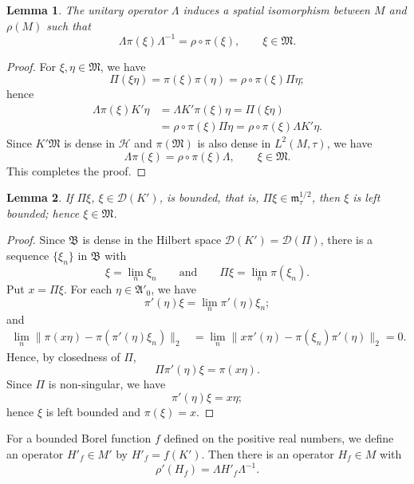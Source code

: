 \documentclass[12pt,b5paper,twoside]{article}
\theoremstyle{takesaki}
\newtheorem{lemma}{Lemma}[section]
\numberwithin{equation}{section}
\begin{document}
\begin{lemma}\label{lem:14.12}
The unitary operator $\Lambda$ induces a spatial isomorphism between
$M$ and $\rho(M)$ such that
\[
 \Lambda\pi(\xi)\Lambda^{-1}=\rho\circ\pi(\xi),
 \qquad \xi\in\mathfrak M.
\]
\end{lemma}

\begin{proof}
For $\xi,\eta\in\mathfrak M$, we have
\[
 \Pi(\xi\eta)=\pi(\xi)\pi(\eta)
  =\rho\circ\pi(\xi)\Pi\eta;
\]
hence
\begin{align*}
 \Lambda\pi(\xi)K'\eta
 &=\Lambda K'\pi(\xi)\eta
  =\Pi(\xi\eta)\\
 &=\rho\circ\pi(\xi)\Pi\eta
  =\rho\circ\pi(\xi)\Lambda K'\eta.
\end{align*}
Since $K'\mathfrak M$ is dense in $\mathcal H$ and
$\pi(\mathfrak M)$ is also dense in $L^2(M,\tau)$, we have
\[
 \Lambda\pi(\xi)=\rho\circ\pi(\xi)\Lambda,
 \qquad \xi\in\mathfrak M.
\]
This completes the proof.
\end{proof}

\begin{lemma}\label{lem:14.13}
If $\Pi\xi$, $\xi\in\mathcal D(K')$, is bounded, that is,
$\Pi\xi\in\mathfrak m_\tau^{1/2}$, then $\xi$ is left bounded; hence
$\xi\in\mathfrak M$.
\end{lemma}

\begin{proof}
Since $\mathfrak B$ is dense in the Hilbert space
$\mathcal D(K')=\mathcal D(\Pi)$, there is a sequence $\{\xi_n\}$ in
$\mathfrak B$ with
\[
 \xi=\lim_n\xi_n
 \qquad\text{and}\qquad
 \Pi\xi=\lim_n\pi(\xi_n).
\]
Put $x=\Pi\xi$.  For each $\eta\in\mathfrak A'_0$, we have
\[
 \pi'(\eta)\xi=\lim_n\pi'(\eta)\xi_n;
\]
and
\begin{align*}
 \lim_n\|\pi(x\eta)-\pi(\pi'(\eta)\xi_n)\|_2
 &=\lim_n\|x\pi'(\eta)-\pi(\xi_n)\pi'(\eta)\|_2=0.
\end{align*}
Hence, by closedness of $\Pi$,
\[
 \Pi\pi'(\eta)\xi=\pi(x\eta).
\]
Since $\Pi$ is non-singular, we have
\[
 \pi'(\eta)\xi=x\eta;
\]
hence $\xi$ is left bounded and $\pi(\xi)=x$.
\end{proof}

For a bounded Borel function $f$ defined on the positive real
numbers, we define an operator $H'_f\in M'$ by $H'_f=f(K')$.  Then
there is an operator $H_f\in M$ with
\begin{equation}
 \rho'(H_f)=\Lambda H'_f\Lambda^{-1}.
 \tag{14.15}\label{eq:14.15}
\end{equation}
\end{document}
